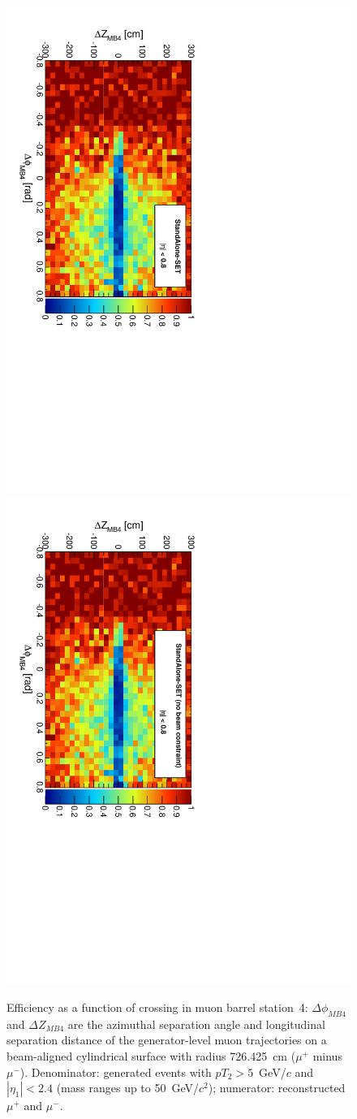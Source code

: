 \documentclass[12pt]{article}
\begin{document}
\begin{figure}[p]
\includegraphics[height=0.5\linewidth, angle=90]{fig/acceptance7_plot/mb4_StandAloneUpdatedSET.pdf}
\includegraphics[height=0.5\linewidth, angle=90]{fig/acceptance7_plot/mb4_StandAloneSET.pdf}

\caption{Efficiency as a function of crossing in muon barrel
  station~4: $\Delta\phi_{MB4}$ and $\Delta Z_{MB4}$ are the azimuthal
  separation angle and longitudinal separation distance of the
  generator-level muon trajectories on a beam-aligned cylindrical
  surface with radius 726.425~cm ($\mu^+$ minus $\mu^-$).
  Denominator: generated events with $pT_2 > 5$~GeV/$c$ and $|\eta_1|
  < 2.4$ (mass ranges up to 50~GeV/$c^2$); numerator: reconstructed
  $\mu^+$ and $\mu^-$. \label{fig:mb4}}
\end{figure}

\clearpage
\end{document}
